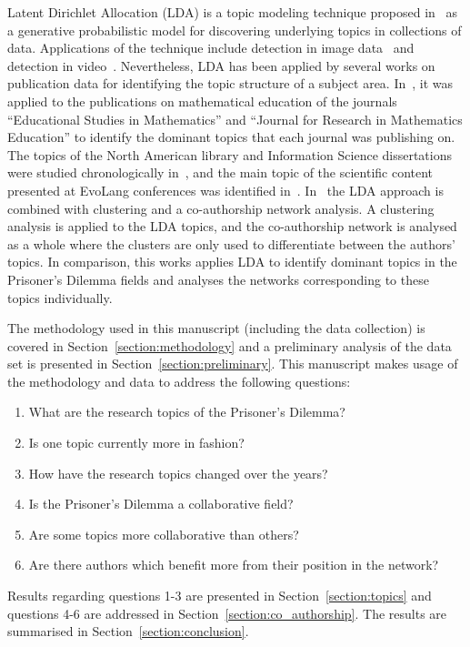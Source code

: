 \documentclass{article}
\theoremstyle{definition}
\begin{document}
Latent Dirichlet Allocation (LDA) is a topic modeling technique proposed
in~\cite{Blei2003} as a generative probabilistic model for discovering
underlying topics in collections of data.
Applications of the technique include detection in image data~\cite{Agarwal2008,
Coelho2010} and detection in video~\cite{Niebles2008, Wang2008}. Nevertheless,
LDA has been applied by several works on publication data for identifying the
topic structure of a subject area. In~\cite{Inglis2018}, it was applied to the
publications on mathematical education of the journals ``Educational Studies in
Mathematics'' and ``Journal for Research in Mathematics Education'' to
identify the dominant topics that each journal was publishing on. The topics of
the North American library and Information Science dissertations were 
studied chronologically in~\cite{Sugimoto2011}, and the main topic of the
scientific content presented at EvoLang conferences was identified
in~\cite{Bergmann2018}. In~\cite{Bergmann2018} the LDA approach is combined with
clustering and a co-authorship network analysis. A clustering analysis is
applied to the LDA topics, and the co-authorship network is analysed as a whole
where the clusters are only used to differentiate between the authors' topics.
In comparison, this works applies
LDA to identify dominant topics in the Prisoner's Dilemma fields and analyses
the networks corresponding to these topics individually.

The methodology used in this manuscript (including the data collection) is
covered in Section~\ref{section:methodology} and a preliminary analysis of the
data set is presented in Section~\ref{section:preliminary}. This manuscript
makes usage of the methodology and data to address the following questions:

\begin{enumerate}
    \item What are the research topics of the Prisoner's Dilemma?
    \item Is one topic currently more in fashion?
    \item How have the research topics changed over the years?
    \item Is the Prisoner's Dilemma a collaborative field?
    \item Are some topics more collaborative than others?
    \item Are there authors which benefit more from their position in the
    network?
\end{enumerate}

Results regarding questions 1-3 are presented in Section~\ref{section:topics}
and questions 4-6 are addressed in Section~\ref{section:co_authorship}. The
results are summarised in Section~\ref{section:conclusion}.
\end{document}
